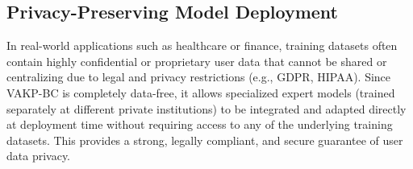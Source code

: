 \documentclass{article}
\theoremstyle{plain}
\theoremstyle{definition}
\theoremstyle{remark}
\begin{document}
\subsection{Privacy-Preserving Model Deployment}
In real-world applications such as healthcare or finance, training datasets often contain highly confidential or proprietary user data that cannot be shared or centralizing due to legal and privacy restrictions (e.g., GDPR, HIPAA). Since VAKP-BC is completely data-free, it allows specialized expert models (trained separately at different private institutions) to be integrated and adapted directly at deployment time without requiring access to any of the underlying training datasets. This provides a strong, legally compliant, and secure guarantee of user data privacy.
\end{document}
